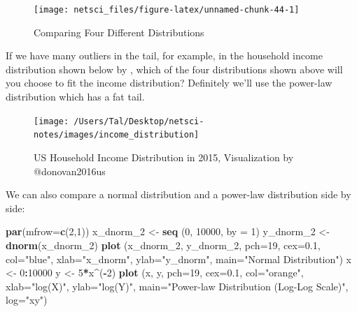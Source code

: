 \documentclass[
]{krantz}
\makeatletter
\newenvironment{Shaded}{\begin{snugshade}}{\end{snugshade}}
\newcommand{\DataTypeTok}[1]{\textcolor[rgb]{0.27,0.27,0.27}{#1}}
\newcommand{\DecValTok}[1]{\textcolor[rgb]{0.06,0.06,0.06}{#1}}
\newcommand{\FloatTok}[1]{\textcolor[rgb]{0.06,0.06,0.06}{#1}}
\newcommand{\KeywordTok}[1]{\textcolor[rgb]{0.27,0.27,0.27}{\textbf{#1}}}
\newcommand{\NormalTok}[1]{#1}
\newcommand{\OperatorTok}[1]{\textcolor[rgb]{0.43,0.43,0.43}{\textbf{#1}}}
\newcommand{\StringTok}[1]{\textcolor[rgb]{0.5,0.5,0.5}{#1}}
\newenvironment{kframe}{%
\medskip{}
\setlength{\fboxsep}{.8em}
 \def\at@end@of@kframe{}%
 \ifinner\ifhmode%
  \def\at@end@of@kframe{\end{minipage}}%
  \begin{minipage}{\columnwidth}%
 \fi\fi%
 \def\FrameCommand##1{\hskip\@totalleftmargin \hskip-\fboxsep
 \colorbox{shadecolor}{##1}\hskip-\fboxsep
     \hskip-\linewidth \hskip-\@totalleftmargin \hskip\columnwidth}%
 \MakeFramed {\advance\hsize-\width
   \@totalleftmargin\z@ \linewidth\hsize
   \@setminipage}}%
 {\par\unskip\endMakeFramed%
 \at@end@of@kframe}
\renewenvironment{Shaded}{\begin{kframe}}{\end{kframe}}
\makeatother
\begin{document}
\begin{figure}

{\centering \texttt{[image: netsci\_files/figure-latex/unnamed-chunk-44-1]} 

}

\caption{Comparing Four Different Distributions}\label{fig:unnamed-chunk-44}
\end{figure}

If we have many outliers in the tail, for example, in the household income distribution shown below by \citet{donovan2016us}, which of the four distributions shown above will you choose to fit the income distribution? Definitely we'll use the power-law distribution which has a fat tail.

\begin{figure}

{\centering \texttt{[image: /Users/Tal/Desktop/netsci-notes/images/income\_distribution]} 

}

\caption{US Household Income Distribution in 2015, Visualization by @donovan2016us}\label{fig:unnamed-chunk-45}
\end{figure}

We can also compare a normal distribution and a power-law distribution side by side:

\begin{Shaded}
\begin{Highlighting}[]
\KeywordTok{par}\NormalTok{(}\DataTypeTok{mfrow=}\KeywordTok{c}\NormalTok{(}\DecValTok{2}\NormalTok{,}\DecValTok{1}\NormalTok{))}
\NormalTok{x_dnorm_}\DecValTok{2}\NormalTok{ <-}\StringTok{ }\KeywordTok{seq}\NormalTok{ (}\DecValTok{0}\NormalTok{, }\DecValTok{10000}\NormalTok{, }\DataTypeTok{by =} \DecValTok{1}\NormalTok{)}
\NormalTok{y_dnorm_}\DecValTok{2}\NormalTok{ <-}\KeywordTok{dnorm}\NormalTok{(x_dnorm_}\DecValTok{2}\NormalTok{)}
\KeywordTok{plot}\NormalTok{ (x_dnorm_}\DecValTok{2}\NormalTok{, y_dnorm_}\DecValTok{2}\NormalTok{, }\DataTypeTok{pch=}\DecValTok{19}\NormalTok{, }\DataTypeTok{cex=}\FloatTok{0.1}\NormalTok{, }\DataTypeTok{col=}\StringTok{"blue"}\NormalTok{,}
      \DataTypeTok{xlab=}\StringTok{"x_dnorm"}\NormalTok{, }\DataTypeTok{ylab=}\StringTok{"y_dnorm"}\NormalTok{,}
      \DataTypeTok{main=}\StringTok{"Normal Distribution"}\NormalTok{)}
\NormalTok{x <-}\StringTok{ }\DecValTok{0}\OperatorTok{:}\DecValTok{10000}
\NormalTok{y <-}\StringTok{ }\DecValTok{5}\OperatorTok{*}\NormalTok{x}\OperatorTok{^}\NormalTok{(}\OperatorTok{-}\DecValTok{2}\NormalTok{)}
\KeywordTok{plot}\NormalTok{ (x, y, }\DataTypeTok{pch=}\DecValTok{19}\NormalTok{, }\DataTypeTok{cex=}\FloatTok{0.1}\NormalTok{, }\DataTypeTok{col=}\StringTok{"orange"}\NormalTok{,}
      \DataTypeTok{xlab=}\StringTok{"log(X)"}\NormalTok{, }\DataTypeTok{ylab=}\StringTok{"log(Y)"}\NormalTok{,}
      \DataTypeTok{main=}\StringTok{"Power-law Distribution (Log-Log Scale)"}\NormalTok{,}
      \DataTypeTok{log=}\StringTok{"xy"}\NormalTok{)}
\end{Highlighting}
\end{Shaded}
\end{document}
